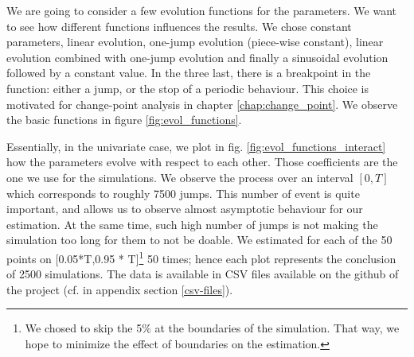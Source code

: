 \documentclass[11pt]{book}
\begin{document}
We are going to consider a few evolution functions for the parameters. We want to see how different functions influences the results. We chose constant parameters, linear evolution, one-jump evolution (piece-wise constant), linear evolution combined with one-jump evolution and finally a sinusoidal evolution followed by a constant value. In the three last, there is a breakpoint in the function: either a jump, or the stop of a periodic behaviour. This choice is motivated for change-point analysis in 
chapter \ref{chap:change_point}. We observe the basic functions in figure \ref{fig:evol_functions}.

Essentially, in the univariate case, we plot in fig. \ref{fig:evol_functions_interact} how the parameters evolve with respect to each other. Those coefficients are the one we use for the simulations. We observe the process over an interval $[0,T]$ which corresponds to roughly 7500 jumps. This number of event is quite important, and allows us to observe almost asymptotic behaviour for our estimation. At the same time, such high number of jumps is not making the simulation too long for them to not be doable. We estimated for each of the 50 points on [0.05*T,0.95 * T]\footnote{We chosed to skip the 5$\%$ at the boundaries of the simulation. That way, we hope to minimize the effect of boundaries on the estimation.}  50 times; hence each plot represents the conclusion of 2500 simulations. The data is available in CSV files available on the github of the project (cf. in appendix section \ref{csv-files}).
\end{document}
